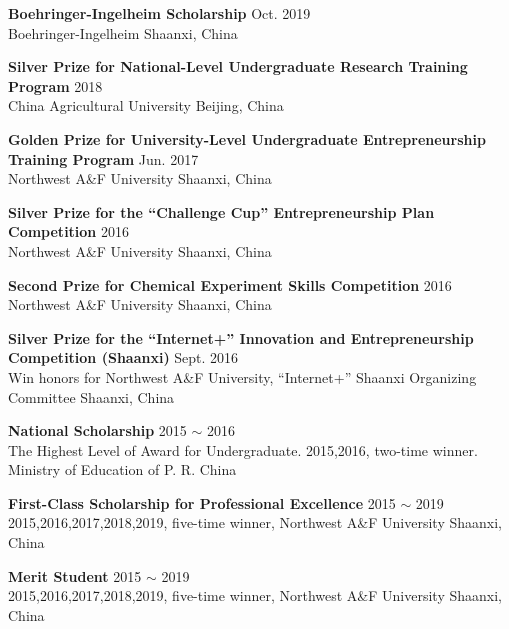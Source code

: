 \textbf{Boehringer-Ingelheim Scholarship} \hfill Oct. 2019 \\
{\small Boehringer-Ingelheim \hfill Shaanxi, China}
    
\vspace{4pt}

\textbf{Silver Prize for National-Level Undergraduate Research Training Program} \hfill 2018 \\
{\small China Agricultural University \hfill Beijing, China}

\vspace{4pt}

\textbf{Golden Prize for University-Level Undergraduate Entrepreneurship Training Program} \hfill Jun. 2017 \\
{\small Northwest A\&F University \hfill Shaanxi, China}

\vspace{4pt}

\textbf{Silver Prize for the ``Challenge Cup'' Entrepreneurship Plan Competition} \hfill 2016 \\
{\small Northwest A\&F University \hfill Shaanxi, China}

\vspace{4pt}

\textbf{Second Prize for Chemical Experiment Skills Competition} \hfill 2016 \\
{\small Northwest A\&F University \hfill Shaanxi, China}

\vspace{4pt}

\textbf{Silver Prize for the ``Internet+'' Innovation and Entrepreneurship Competition (Shaanxi)} \hfill Sept. 2016 \\
{\small Win honors for Northwest A\&F University, ``Internet+'' Shaanxi Organizing Committee \hfill Shaanxi, China}

\vspace{4pt}

\textbf{National Scholarship} \hfill 2015 $\sim$ 2016 \\
{\small The Highest Level of Award for Undergraduate. 2015,2016, two-time winner. \hfill Ministry of Education of P. R. China}\\


\vspace{4pt}

\textbf{First-Class Scholarship for Professional Excellence} \hfill 2015 $\sim$ 2019 \\
{\small 2015,2016,2017,2018,2019, five-time winner, Northwest A\&F University \hfill Shaanxi, China}

\vspace{4pt}

\textbf{Merit Student} \hfill 2015 $\sim$ 2019 \\
{\small 2015,2016,2017,2018,2019, five-time winner, Northwest A\&F University \hfill Shaanxi, China}
